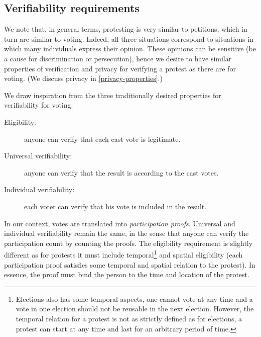 \subsection{Verifiability requirements}%
\label{verifiability-properties}

We note that, in general terms, protesting is very similar to petitions, which in turn are similar to voting.
Indeed, all three situations correspond to situations in which many individuals express their opinion.
These opinions can be sensitive (\eg be a cause for discrimination or persecution), hence we desire to have similar properties of verification and privacy for verifying a protest as there are for voting.
(We discuss privacy in \cref{privacy-properties}.)

We draw inspiration from the three traditionally desired properties for 
verifiability for voting:
\begin{description}
  \item[Eligibility:] anyone can verify that each cast vote is legitimate.
  \item[Universal verifiability:] anyone can verify that the result is according to the cast votes.
  \item[Individual verifiability:] each voter can verify that his vote is included in the result.
\end{description}
In our context, votes are translated into \emph{participation proofs}.
Universal and individual verifiability remain the same, in the sense that anyone can verify the participation count by counting the proofs.
The eligibility requirement is slightly different as for protests it must 
include temporal\footnote{%
  Elections also has some temporal aspects, \eg one cannot vote at any time and 
  a vote in one election should not be reusable in the next election.
  However, the temporal relation for a protest is not as strictly defined as 
  for elections, a protest can start at any time and last for an arbitrary 
  period of time.
} and spatial eligibility (\ie each participation proof satisfies some temporal 
and spatial relation to the protest).
In essence, the proof must bind the person to the time and location of the protest.

